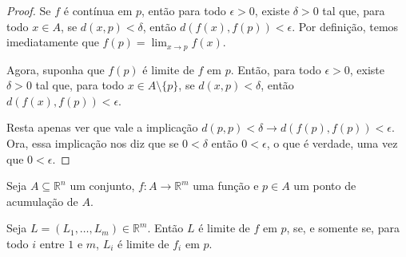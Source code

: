 \begin{proof}
    Se $f$ é contínua em $p$, então para todo $\epsilon>0$, existe $\delta>0$ tal que, para todo $x \in A$, se $d(x, p) < \delta$, então $d(f(x), f(p)) < \epsilon$.
    Por definição, temos imediatamente que $f(p)=\lim_{x\to p} f(x)$.

    Agora, suponha que $f(p)$ é limite de $f$ em $p$. Então, para todo $\epsilon>0$, existe $\delta>0$ tal que, para todo $x \in A\setminus\{p\}$, se $d(x, p) < \delta$, então $d(f(x), f(p)) < \epsilon$.

    Resta apenas ver que vale a implicação $d(p, p)<\delta\rightarrow d(f(p), f(p)) < \epsilon$.
    Ora, essa implicação nos diz que se $0<\delta$ então $0<\epsilon$, o que é verdade, uma vez que $0<\epsilon$.
\end{proof}


\begin{proposition}
    Seja $A\subseteq \mathbb R^n$ um conjunto, $f: A \to \mathbb R^m$ uma função e $p \in A$ um ponto de acumulação de $A$.

    Seja $L=(L_1, \dots, L_m)\in \mathbb R^m$.
    Então $L$ é limite de $f$ em $p$, se, e somente se, para todo $i$ entre $1$ e $m$, $L_i$ é limite de $f_i$ em $p$.
\end{proposition}

